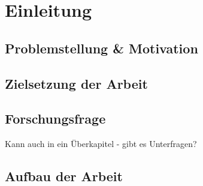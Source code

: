 \chapter{Einleitung}

\section{Problemstellung \& Motivation}
\section{Zielsetzung der Arbeit}
\section{Forschungsfrage}
Kann auch in ein Überkapitel - gibt es Unterfragen?
\section{Aufbau der Arbeit}